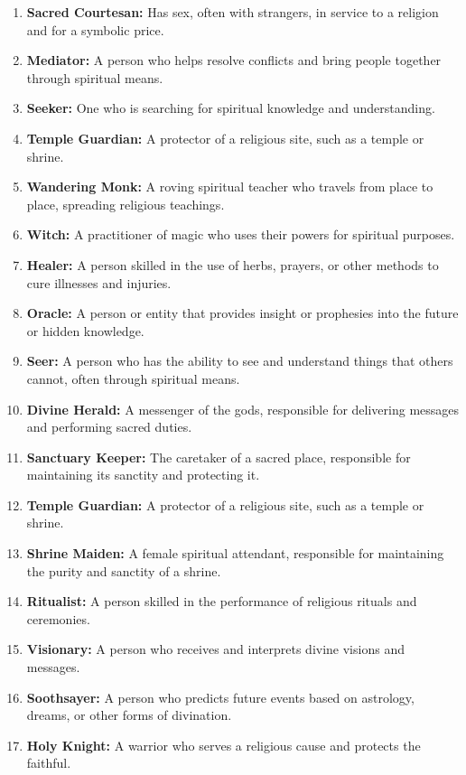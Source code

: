 \documentclass[12pt]{book}  %
\begin{document}
\begin{enumerate}
    \item \textbf{Sacred Courtesan:} Has sex, often with strangers, in service to a religion and for a symbolic price.
    \item \textbf{Mediator:} A person who helps resolve conflicts and bring people together through spiritual means.
    \item \textbf{Seeker:} One who is searching for spiritual knowledge and understanding.
    \item \textbf{Temple Guardian:} A protector of a religious site, such as a temple or shrine.
    \item \textbf{Wandering Monk:} A roving spiritual teacher who travels from place to place, spreading religious teachings.
    \item \textbf{Witch:} A practitioner of magic who uses their powers for spiritual purposes.
    \item \textbf{Healer:} A person skilled in the use of herbs, prayers, or other methods to cure illnesses and injuries.
    \item \textbf{Oracle:} A person or entity that provides insight or prophesies into the future or hidden knowledge.
    \item \textbf{Seer:} A person who has the ability to see and understand things that others cannot, often through spiritual means.
    \item \textbf{Divine Herald:} A messenger of the gods, responsible for delivering messages and performing sacred duties.
    \item \textbf{Sanctuary Keeper:} The caretaker of a sacred place, responsible for maintaining its sanctity and protecting it.
    \item \textbf{Temple Guardian:} A protector of a religious site, such as a temple or shrine.
    \item \textbf{Shrine Maiden:} A female spiritual attendant, responsible for maintaining the purity and sanctity of a shrine.
    \item \textbf{Ritualist:} A person skilled in the performance of religious rituals and ceremonies.
    \item \textbf{Visionary:} A person who receives and interprets divine visions and messages.
    \item \textbf{Soothsayer:} A person who predicts future events based on astrology, dreams, or other forms of divination.
    \item \textbf{Holy Knight:} A warrior who serves a religious cause and protects the faithful.

\end{enumerate}
\end{document}
